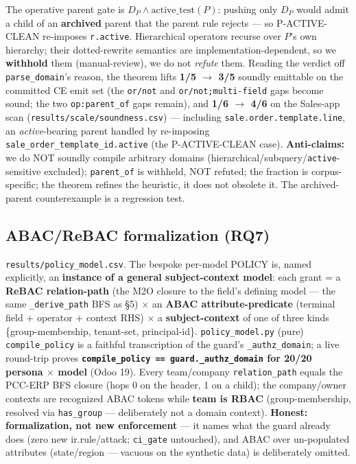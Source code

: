 \documentclass[11pt,a4paper]{article}
\newcommand{\code}[1]{\texttt{#1}}
\begin{document}
The operative parent gate is $D_P \wedge \mathrm{active\_test}(P)$: pushing only $D_P$ would admit a child of an
\textbf{archived} parent that the parent rule rejects --- so P-ACTIVE-CLEAN re-imposes \code{r.active}.
Hierarchical operators recurse over $P$'s own hierarchy; their dotted-rewrite semantics are
implementation-dependent, so we \textbf{withhold} them (manual-review), we do not \emph{refute} them. Reading
the verdict off \code{parse_domain}'s reason, the theorem lifts \textbf{1/5 $\to$ 3/5} soundly emittable on the
committed CE emit set (the \code{or/not} and \code{or/not;multi-field} gaps become sound; the two
\code{op:parent_of} gaps remain), and \textbf{1/6 $\to$ 4/6} on the Sales-app scan
(\code{results/scale/soundness.csv}) --- including \code{sale.order.template.line}, an \emph{active}-bearing
parent handled by re-imposing \code{sale_order_template_id.active} (the P-ACTIVE-CLEAN case). \textbf{Anti-claims:}
we do NOT soundly compile arbitrary domains (hierarchical/subquery/\code{active}-sensitive excluded);
\code{parent_of} is withheld, NOT refuted; the fraction is corpus-specific; the theorem refines the heuristic,
it does not obsolete it. The archived-parent counterexample is a regression test.

\subsection{ABAC/ReBAC formalization (RQ7)}
\code{results/policy_model.csv}. The bespoke per-model POLICY is, named explicitly, an \textbf{instance of a
general subject-context model}: each grant = a \textbf{ReBAC relation-path} (the M2O closure to the field's
defining model --- the same \code{_derive_path} BFS as \S5) $\times$ an \textbf{ABAC attribute-predicate}
(terminal field + operator + context RHS) $\times$ a \textbf{subject-context} of one of three kinds
\{group-membership, tenant-set, principal-id\}. \code{policy_model.py} (pure) \code{compile_policy} is a
faithful transcription of the guard's \code{_authz_domain}; a live round-trip proves \textbf{\code{compile_policy
== guard._authz_domain} for 20/20 persona $\times$ model} (Odoo 19). Every team/company \code{relation_path}
equals the PCC-ERP BFS closure (hops 0 on the header, 1 on a child); the company/owner contexts are recognized
ABAC tokens while \textbf{team is RBAC} (group-membership, resolved via \code{has_group} --- deliberately not a
domain context). \textbf{Honest: formalization, not new enforcement} --- it names what the guard already does
(zero new ir.rule/attack; \code{ci_gate} untouched), and ABAC over un-populated attributes (state/region ---
vacuous on the synthetic data) is deliberately omitted.
\end{document}
